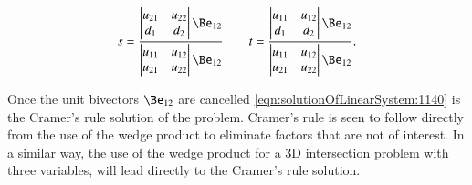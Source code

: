 \begin{equation}\label{eqn:solutionOfLinearSystem:1140}
s =
\frac{
\begin{vmatrix}
u_{21} & u_{22} \\
d_1 & d_2
\end{vmatrix}
\Be_{12}
}
{
\begin{vmatrix}
u_{11} & u_{12} \\
u_{21} & u_{22} \\
\end{vmatrix}
\Be_{12}
}
\qquad
t =
\frac{
\begin{vmatrix}
u_{11} & u_{12} \\
d_1 & d_2
\end{vmatrix}
\Be_{12}
}
{
\begin{vmatrix}
u_{11} & u_{12} \\
u_{21} & u_{22} \\
\end{vmatrix}
\Be_{12}
}
.
\end{equation}

Once the unit bivectors \( \Be_{12} \) are cancelled \cref{eqn:solutionOfLinearSystem:1140} is the Cramer's rule solution of the problem.  Cramer's rule is seen to follow directly from the use of the wedge product to eliminate factors that are not of interest.
In a similar way, the use of the wedge product for a 3D intersection problem with three variables, will lead directly to the Cramer's rule solution.

